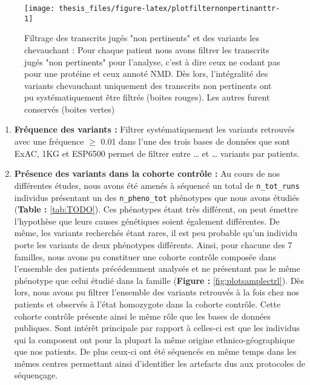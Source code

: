 \documentclass[12pt,twoside]{reedthesis}
\theoremstyle{definition}
\theoremstyle{definition}
\theoremstyle{remark}
\begin{document}
  \begin{figure}
  
  {\centering \texttt{[image: thesis\_files/figure-latex/plotfilternonpertinanttr-1]} 
  
  }
  
  \caption[Filtrage des transcrits jugés "non pertinents" et des variants les chevauchant]{Filtrage des transcrits jugés "non pertinents" et des variants les chevauchant : Pour chaque patient nous avons filtrer les transcrits jugés "non pertinents" pour l'analyse, c'est à dire ceux ne codant pas pour une protéine et ceux annoté NMD. Dès lors, l'intégralité des variants chevauchant uniquement des transcrits non pertinents ont pu systématiquement être filtrés (boites rouges). Les autres furent conservés (boites vertes)}\label{fig:plotfilternonpertinanttr}
  \end{figure}
  
  \begin{enumerate}
  \def\labelenumi{\arabic{enumi}.}
  \setcounter{enumi}{4}
  \item
    \textbf{Fréquence des variants :} Filtrer systématiquement les
    variants retrouvés avec une fréquence \(\ge\) 0.01 dans l'une des
    trois bases de données que sont ExAC, 1KG et ESP6500 permet de filtrer
    entre \ldots{} et \ldots{} variants par patients.
  \item
    \textbf{Présence des variants dans la cohorte contrôle :} Au cours de
    nos différentes études, nous avons été amenés à séquencé un total de
    \texttt{n\_tot\_runs} individus présentant un des
    \texttt{n\_pheno\_tot} phénotypes que nous avons étudiés
    (\textbf{Table : }\ref{tab:TODO}). Ces phénotypes étant très
    différent, on peut émettre l'hypothèse que leurs causes génétiques
    soient également différentes. De même, les variants recherchés étant
    rares, il est peu probable qu'un individu porte les variants de deux
    phénotypes différents. Ainsi, pour chacune des 7 familles, nous avons
    pu constituer une cohorte contrôle composée dans l'ensemble des
    patients précédemment analysés et ne présentant pas le même phénotype
    que celui étudié dans la famille (\textbf{Figure :}
    \ref{fig:plotsamplectrl}). Dès lors, nous avons pu filtrer l'ensemble
    des variants retrouvés à la fois chez nos patients et observés à
    l'état homozygote dans la cohorte contrôle. Cette cohorte contrôle
    présente ainsi le même rôle que les bases de données publiques. Sont
    intérêt principale par rapport à celles-ci est que les individus qui
    la composent ont pour la plupart la même origine ethnico-géographique
    que nos patients. De plus ceux-ci ont été séquencés en même temps dans
    les mêmes centres permettant ainsi d'identifier les artefacts dus aux
    protocoles de séquençage.
  \end{enumerate}
  
\end{document}
